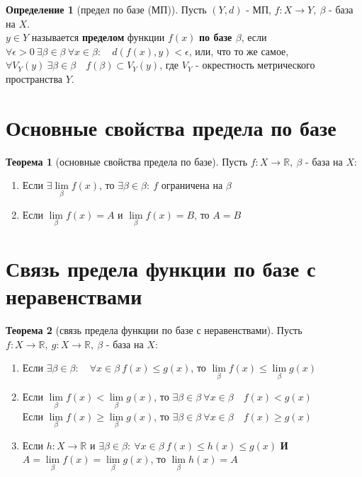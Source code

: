 \documentclass{report}
\theoremstyle{definition}
\newtheorem*{definition}{Определение}
\newtheorem*{theorem}{Теорема}
\begin{document}
\begin{definition}[предел по базе (МП)]
    Пусть $(Y, d)$ - МП, $f:X\rightarrow Y, \ \beta$ - база на $X$.\\

    $y\in Y$ называется \textbf{пределом} функции $f(x)$ \textbf{по базе $\beta$}, если $\forall \epsilon > 0 \
        \exists \beta \in \beta \ \forall x \in \beta: \quad d(f(x), y) < \epsilon$, или, что то же самое,
    $\forall V_{Y}(y) \ \exists \beta \in \beta \quad f(\beta) \subset V_{Y}(y)$, где $V_{Y}$ - окрестность
    метрического пространства $Y$.
\end{definition}

\section{Основные свойства предела по базе}

\begin{theorem}[основные свойства предела по базе]
    Пусть $f:X\rightarrow\mathbb{R}, \ \beta$ - база на $X$:
    \begin{enumerate}
        \item Если $\exists \underset{\beta}{\lim}f(x)$, то $\exists \beta \in \beta: \ f$ ограничена на $\beta$
        \item Если $\underset{\beta}{\lim}f(x) = A$ и $\underset{\beta}{\lim}f(x) = B$, то $A = B$
    \end{enumerate}
\end{theorem}

\section{Связь предела функции по базе с неравенствами}

\begin{theorem}[связь предела функции по базе с неравенствами]
    Пусть $f:X\rightarrow\mathbb{R}, \ g:X\rightarrow\mathbb{R}, \ \beta$ - база на $X$:
    \begin{enumerate}
        \item Если $\exists\beta\in\beta: \quad \forall x \in \beta \ f(x) \leqslant g(x)$, то $\underset{\beta}
                  {\lim}f(x) \leqslant \underset{\beta}{\lim}g(x)$
        \item Если $\underset{\beta}{\lim}f(x) < \underset{\beta}{\lim}g(x)$, то $\exists\beta\in\beta \ \forall
                  x \in \beta \quad f(x) < g(x)$\\

              Если $\underset{\beta}{\lim}f(x) \geqslant \underset{\beta}{\lim}g(x)$, то $\exists\beta\in\beta \ \forall
                  x \in \beta \quad f(x) \geqslant g(x)$
        \item Если $h:X\rightarrow \mathbb{R}$ и $\exists\beta\in\beta: \ \forall x \in \beta \ f(x) \leqslant h(x)
                  \leqslant g(x)$ \textbf{И} $A = \underset{\beta}{\lim}f(x) = \underset{\beta}{\lim}g(x)$, то $\underset{\beta}
                  {\lim}h(x) = A$
    \end{enumerate}
\end{theorem}
\end{document}
